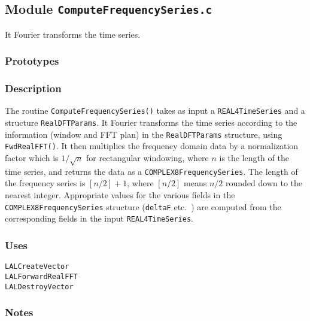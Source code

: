 \newpage
\subsection{Module \texttt{ComputeFrequencySeries.c}}
\label{ss:ComputeFrequencySeries.c}

It Fourier transforms the time series.

\subsubsection*{Prototypes}
\vspace{0.1in}


\subsubsection*{Description}

The routine \verb+ComputeFrequencySeries()+ takes as input a
\verb+REAL4TimeSeries+ and a structure \verb+RealDFTParams+.  It Fourier
transforms the time series according to the information (window and FFT plan)
in the \verb+RealDFTParams+ structure, using \verb+FwdRealFFT()+.  It then
multiplies the frequency domain data by a normalization factor which is
$1/\sqrt{n}$ for rectangular windowing, where $n$ is the length of the time
series, and returns the data as a \verb+COMPLEX8FrequencySeries+.  The length
of the frequency series is $[n/2]+1$, where $[n/2]$ means $n/2$ rounded down
to the nearest integer.  Appropriate values for the various fields in the
\verb+COMPLEX8FrequencySeries+ structure (\verb+deltaF+ etc.~) are computed
from the corresponding fields in the input \verb+REAL4TimeSeries+. 

\subsubsection*{Uses}
\begin{verbatim}
LALCreateVector
LALForwardRealFFT
LALDestroyVector
\end{verbatim}

\subsubsection*{Notes}

\vfill{\footnotesize}


